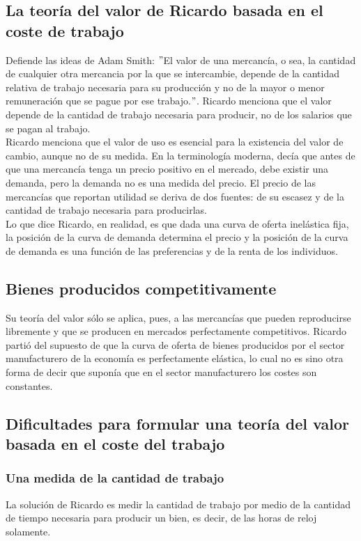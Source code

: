 \documentclass[10pt]{book}
\begin{document}
\subsection*{La teoría del valor de Ricardo basada en el coste de trabajo}

Defiende las ideas de Adam Smith: $"$El valor de una mercancía, o sea, la cantidad de cualquier otra mercancia por la que se intercambie, depende de la cantidad relativa de trabajo necesaria para su producción y no de la mayor o menor remuneración que se pague por ese trabajo.$"$. Ricardo menciona que el valor depende de la cantidad de trabajo necesaria para producir, no de los salarios que se pagan al trabajo.\\
Ricardo menciona que el valor de uso es esencial para la existencia del valor de cambio, aunque no de su medida. En la terminología moderna, decía que antes de que una mercancía tenga
 un precio positivo en el mercado, debe existir una demanda, pero la demanda no es una medida del precio. El precio de las mercancías que reportan utilidad se deriva de dos fuentes: de su escasez y de la cantidad de trabajo necesaria para producirlas.\\
Lo que dice Ricardo, en realidad, es que dada una curva de oferta inelástica fija, la posición de la curva de demanda determina el precio y la posición de la curva de demanda es una función de las preferencias y de la renta de los individuos.\\

\subsection*{Bienes producidos competitivamente}
Su teoría del valor sólo se aplica, pues, a las mercancías que pueden reproducirse libremente y que se producen en mercados perfectamente competitivos. Ricardo partió del supuesto de que la curva de oferta de bienes producidos por el sector manufacturero de la economía es perfectamente elástica, lo cual no es sino otra forma de decir que suponía que en el sector manufacturero los costes son constantes. \\

\subsection*{Dificultades para formular una teoría del valor basada en el coste del trabajo}

\subsubsection*{Una medida de la cantidad de trabajo}
La solución de Ricardo es medir la cantidad de trabajo por medio de la cantidad de tiempo necesaria para producir un bien, es decir, de las horas de reloj solamente.
\end{document}
